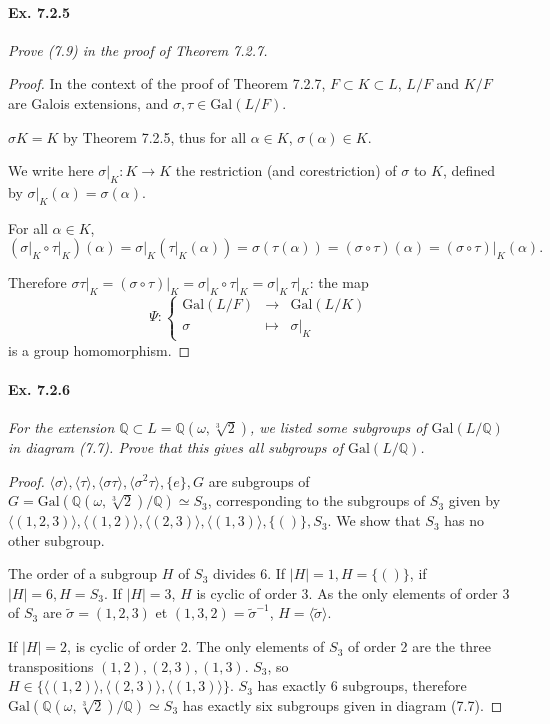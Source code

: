 \documentclass[11pt,a4paper]{article}
\newcommand{\Q}{\mathbb{Q}}
\newcommand{\Gal}{\mathrm{Gal}}
\begin{document}
\paragraph{Ex. 7.2.5}

{\it Prove (7.9) in the proof of Theorem 7.2.7.
}

\begin{proof}
In the context of the proof of Theorem 7.2.7, $F \subset K \subset L$, $L/F$ and $K/F$ are Galois extensions, and $\sigma, \tau \in \Gal(L/F)$.

$\sigma K = K$ by Theorem 7.2.5, thus for all $\alpha \in K$, $\sigma(\alpha)  \in K$.

We write here $\sigma\vert_K : K \to K$ the restriction (and corestriction) of $\sigma$ to $K$, defined by $\sigma\vert_K(\alpha) = \sigma(\alpha)$. 

For all $\alpha \in K$, 
$$(\sigma\vert_{K} \circ \tau\vert_{K})(\alpha) =\sigma\vert_K( \tau\vert_K(\alpha))  = \sigma(\tau(\alpha)) =(\sigma \circ \tau)(\alpha) =( \sigma\circ \tau)\vert_K(\alpha) .$$

Therefore $\sigma \tau \vert_K = (\sigma \circ \tau)\vert_K = \sigma\vert_K \circ \tau\vert_K = \sigma\vert_K\, \tau \vert_K$: the map
$$\Psi :
\left\{
\begin{array}{ccc}
 \Gal(L/F) &   \to &  \Gal(L/K) \\
 \sigma & \mapsto  &   \sigma\vert_K   
\end{array}
\right.
$$
is a group homomorphism.
\end{proof}

\paragraph{Ex. 7.2.6}

{\it For the extension $\Q\subset L = \Q(\omega,\sqrt[3]{2})$, we listed some subgroups of $\Gal(L/\Q)$ in diagram (7.7). Prove that this gives all subgroups of $\Gal(L/\Q)$.
}

\begin{proof}
 $\langle \sigma \rangle, \langle \tau \rangle,\langle \sigma \tau \rangle, \langle \sigma^2 \tau \rangle, \{e\}, G$ are subgroups of $G=\Gal(\Q(\omega,\sqrt[3]{2})/\Q) \simeq S_3$, corresponding to the subgroups of $S_3$ given by $\langle(1,2,3)\rangle,\langle(1,2)\rangle,\langle(2,3)\rangle,\langle(1,3)\rangle,\{()\}, S_3$. We show that $S_3$ has no other subgroup.
 
The order of a subgroup $H$ of $S_3$ divides 6. If $\vert H \vert = 1, H = \{()\}$, if $\vert H \vert = 6, H = S_3$. If $\vert H \vert = 3$, $H$ is cyclic of order 3. 
As the only elements of order 3 of $S_3$ are $\tilde{\sigma} = (1,2,3)$ et $(1,3,2) = \tilde{\sigma}^{-1}$, $H =\langle \tilde{\sigma} \rangle$.
 
If $\vert H \vert = 2$, is  cyclic of order 2. The only elements of $S_3$ of order 2 are the three transpositions $(1,2),(2,3),(1,3)$. $S_3$, so $H \in \{\langle(1,2)\rangle,\langle(2,3)\rangle,\langle(1,3)\rangle\}$. $S_3$ has exactly 6 subgroups, therefore  $\Gal(\Q(\omega,\sqrt[3]{2})/\Q) \simeq S_3$ has exactly six subgroups given in diagram (7.7).
\end{proof}
\end{document}
